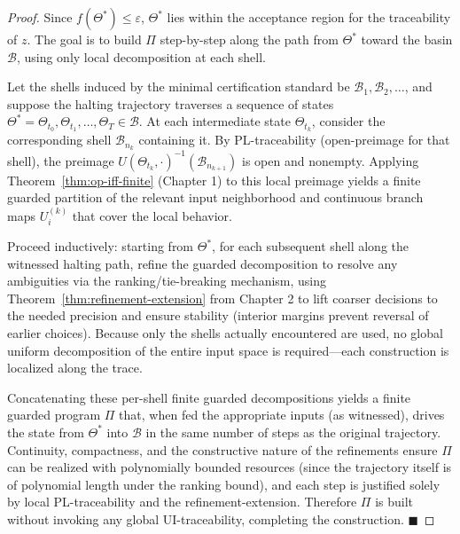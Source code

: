 \documentclass[12pt]{article}
\theoremstyle{definition}
\theoremstyle{plain}
\begin{document}
\begin{proof}
Since \(f(\Theta^*)\le \varepsilon\), \(\Theta^*\) lies within the acceptance region for the traceability of \(z\). The goal is to build \(\Pi\) step-by-step along the path from \(\Theta^*\) toward the basin \(\mathcal B\), using only local decomposition at each shell.

Let the shells induced by the minimal certification standard be \(\mathcal B_1,\mathcal B_2,\dots\), and suppose the halting trajectory traverses a sequence of states \(\Theta^* = \Theta_{t_0}, \Theta_{t_1}, \dots,\Theta_T\in\mathcal B\). At each intermediate state \(\Theta_{t_k}\), consider the corresponding shell \(\mathcal B_{n_k}\) containing it. By PL-traceability (open-preimage for that shell), the preimage \(U(\Theta_{t_k},\cdot)^{-1}(\mathcal B_{n_{k+1}})\) is open and nonempty. Applying Theorem~\ref{thm:op-iff-finite} (Chapter 1) to this local preimage yields a finite guarded partition of the relevant input neighborhood and continuous branch maps \(U^{(k)}_i\) that cover the local behavior.

Proceed inductively: starting from \(\Theta^*\), for each subsequent shell along the witnessed halting path, refine the guarded decomposition to resolve any ambiguities via the ranking/tie-breaking mechanism, using Theorem~\ref{thm:refinement-extension} from Chapter 2 to lift coarser decisions to the needed precision and ensure stability (interior margins prevent reversal of earlier choices). Because only the shells actually encountered are used, no global uniform decomposition of the entire input space is required—each construction is localized along the trace.

Concatenating these per-shell finite guarded decompositions yields a finite guarded program \(\Pi\) that, when fed the appropriate inputs (as witnessed), drives the state from \(\Theta^*\) into \(\mathcal B\) in the same number of steps as the original trajectory. Continuity, compactness, and the constructive nature of the refinements ensure \(\Pi\) can be realized with polynomially bounded resources (since the trajectory itself is of polynomial length under the ranking bound), and each step is justified solely by local PL-traceability and the refinement-extension. Therefore \(\Pi\) is built without invoking any global UI-traceability, completing the construction. \(\blacksquare\)
\end{proof}
\end{document}
